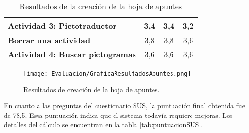 \begin{table}[H]
{\begin{tabular}{l|c|c|c|}
            \multicolumn{1}{|l|}{\textbf{Actividad 3: Pictotraductor}}      & 3,4                                                                                                                                              & 3,4                                                                                                                                                                       & 3,2                                                                                                                                                                                      \\ \hline
            \multicolumn{1}{|l|}{\textbf{Borrar una actividad}}             & 3,8                                                                                                                                              & 3,8                                                                                                                                                                       & 3,6                                                                                                                                                                                      \\ \hline
            \multicolumn{1}{|l|}{\textbf{Actividad 4: Buscar pictogramas}}  & 3,6                                                                                                                                              & 3,6                                                                                                                                                                       & 3,6                                                                                                                                                                                      \\ \hline
        \end{tabular}
    }
    \caption{Resultados de la creación de la hoja de apuntes}
    \label{tab:resultadosApuntes}
\end{table}

\begin{figure}[ht!]
    \centering
    \texttt{[image: Evaluacion/GraficaResultadosApuntes.png]}
    \caption{Resultados de creación de la hoja de apuntes.}
    \label{fig:resultadosApuntes}
\end{figure}

En cuanto a las preguntas del cuestionario SUS, la puntuación final obtenida fue de 78,5. Esta puntuación indica que el sistema todavía requiere mejoras. Los detalles del cálculo se encuentran en la tabla \ref{tab:puntuacionSUS}.

